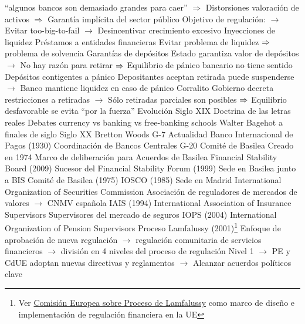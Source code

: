 \documentclass{nuevotema}
\begin{document}
\begin{esquemal}
				\4 ``algunos bancos son demasiado grandes para caer''
				\4[] $\Rightarrow$ Distorsiones valoración de activos
				\4[] $\Rightarrow$ Garantía implícita del sector público
				\4 Objetivo de regulación:
				\4[] $\to$ Evitar too-big-to-fail
				\4[] $\to$ Desincentivar crecimiento excesivo
			\3 Inyecciones de liquidez
				\4 Préstamos a entidades financieras
				\4 Evitar problema de liquidez $\Rightarrow$ problema de solvencia
			\3 Garantías de depósitos
				\4 Estado garantiza valor de depósitos
				\4[] $\to$ No hay razón para retirar
				\4[] $\Rightarrow$ Equilibrio de pánico bancario no tiene sentido
				\4 Depósitos contigentes a pánico
				\4[] Depositantes aceptan retirada puede suspenderse
				\4[] $\to$ Banco mantiene liquidez en caso de pánico
			\3 Corralito
				\4[] Gobierno decreta restricciones a retiradas
				\4[] $\to$ Sólo retiradas parciales son posibles
				\4[] $\Rightarrow$ Equilibrio desfavorable se evita ``por la fuerza''
	\1 
		\2 Evolución
			\3 Siglo XIX
				\4 Doctrina de las letras reales
				\4 Debates currency vs banking vs free-banking schools
				\4 Walter Bagehot a finales de siglo
			\3 Siglo XX
				\4 Bretton Woods
				\4 G-7
			\3 Actualidad
				\4 Banco Internacional de Pagos (1930)
				\4[] Coordinación de Bancos Centrales
				\4 G-20
				\4 Comité de Basilea
				\4[] Creado en 1974
				\4[] Marco de deliberación para Acuerdos de Basilea
				\4 Financial Stability Board (2009)
				\4[] Sucesor del Financial Stability Forum (1999)
				\4[] Sede en Basilea junto a BIS
				\4 Comité de Basilea (1975)
				\4 IOSCO (1985)
				\4[] Sede en Madrid
				\4[] International Organization of Securities Commission
				\4[] Asociación de reguladores de mercados de valores
				\4[] $\to$ CNMV española
				\4 IAIS (1994)
				\4[] International Association of Insurance Supervisors
				\4[] Supervisores del mercado de seguros
				\4 IOPS (2004)
				\4[] International Organization of Pension Supervisors
				\4 Proceso Lamfalussy (2001)\footnote{ Ver \href{https://ec.europa.eu/info/business-economy-euro/banking-and-finance/financial-reforms-and-their-progress/regulatory-process-financial-services/regulatory-process-financial-services_en}{Comisión Europea sobre Proceso de Lamfalussy} como marco de diseño e implementación de regulación financiera en la UE}
				\4[] Enfoque de aprobación de nueva regulación
				\4[] $\to$ regulación comunitaria de servicios financieros
				\4[] $\to$ división en 4 niveles del proceso de regulación
				\4[] Nivel 1
				\4[] $\to$ PE y CdUE adoptan nuevas directivas y reglamentos
				\4[] $\to$ Alcanzar acuerdos políticos clave

\end{esquemal}
\end{document}
